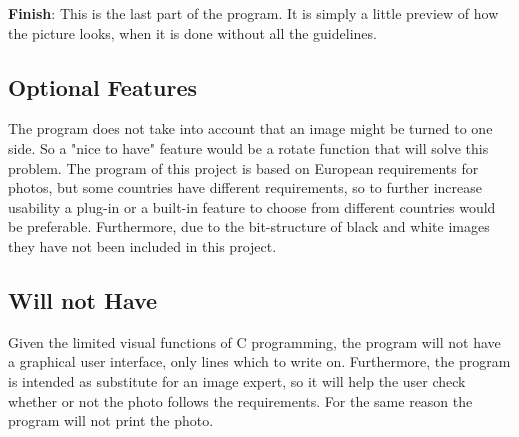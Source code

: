 \textbf{Finish}:
This is the last part of the program. It is simply a little preview of how the picture looks, when it is done without all the guidelines.
\newline


\subsection{Optional Features}
The program does not take into account that an image might be turned to one side. So a "nice to have" feature would be a rotate function that will solve this problem. The program of this project is based on European requirements for photos, but some countries have different requirements, so to further increase usability a plug-in or a built-in feature to choose from different countries would be preferable. Furthermore, due to the bit-structure of black and white images they have not been included in this project.

\subsection{Will not Have}
Given the limited visual functions of C programming, the program will not have a graphical user interface, only lines which to write on. Furthermore, the program is intended as substitute for an image expert, so it will help the user check whether or not the photo follows the requirements. For the same reason the program will not print the photo.
